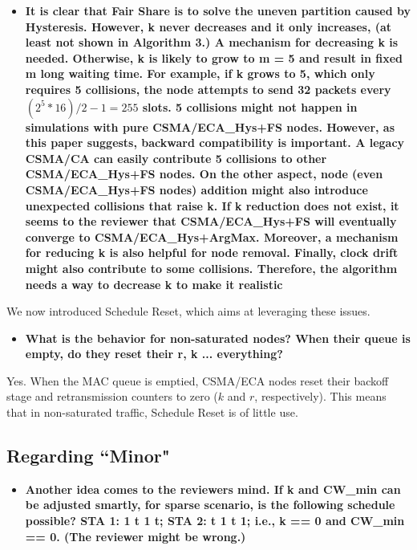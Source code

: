 \documentclass[]{article}
\begin{document}
		\begin{itemize}
			\item {\bfseries It is clear that Fair Share is to solve the uneven partition caused by Hysteresis. However, k never decreases and it only increases, (at least not shown in Algorithm 3.) A mechanism for decreasing k is needed. Otherwise, k is likely to grow to m = 5 and result in fixed m long waiting time. For example, if k grows to 5, which only requires 5 collisions, the node attempts to send 32 packets every $(2 ^ 5 * 16)/2 - 1 = 255$ slots. 5 collisions might not happen in simulations with pure CSMA/ECA\_{Hys+FS} nodes. However, as this paper suggests, backward compatibility is important. A legacy CSMA/CA can easily contribute 5 collisions to other CSMA/ECA\_{Hys+FS} nodes. On the other aspect, node (even CSMA/ECA\_{Hys+FS} nodes) addition might also introduce unexpected collisions that raise k. If k reduction does not exist, it seems to the reviewer that CSMA/ECA\_{Hys+FS} will eventually converge to CSMA/ECA\_{Hys+ArgMax}.  Moreover, a mechanism for reducing k is also helpful for node removal. Finally, clock drift might also contribute to some collisions. Therefore, the algorithm needs a way to decrease k to make it realistic}
		\end{itemize}
		
		We now introduced Schedule Reset, which aims at leveraging these issues. 
		
		\begin{itemize}
			\item {\bfseries What is the behavior for non-saturated nodes? When their queue is empty, do they reset their r, k ... everything?}
		\end{itemize}
		
		Yes. When the MAC queue is emptied, CSMA/ECA nodes reset their backoff stage and retransmission counters to zero ($k$ and $r$, respectively). This means that in non-saturated traffic, Schedule Reset is of little use.
		
	\subsection{Regarding ``Minor"}
		\begin{itemize}
			\item {\bfseries Another idea comes to the reviewers mind. If k and CW\_min can be adjusted smartly, for sparse scenario, is the following schedule possible?
    					STA 1:  1   t   1   t;
     					STA 2:  t   1   t   1; 
			i.e., k == 0 and CW\_min == 0. (The reviewer might be wrong.)}
		\end{itemize}
		
\end{document}
